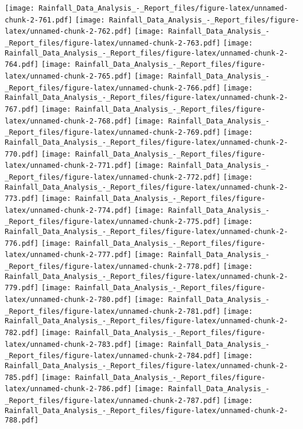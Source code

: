 \documentclass[
]{article}
\begin{document}
\texttt{[image: Rainfall\_Data\_Analysis\_-\_Report\_files/figure-latex/unnamed-chunk-2-761.pdf]}
\texttt{[image: Rainfall\_Data\_Analysis\_-\_Report\_files/figure-latex/unnamed-chunk-2-762.pdf]}
\texttt{[image: Rainfall\_Data\_Analysis\_-\_Report\_files/figure-latex/unnamed-chunk-2-763.pdf]}
\texttt{[image: Rainfall\_Data\_Analysis\_-\_Report\_files/figure-latex/unnamed-chunk-2-764.pdf]}
\texttt{[image: Rainfall\_Data\_Analysis\_-\_Report\_files/figure-latex/unnamed-chunk-2-765.pdf]}
\texttt{[image: Rainfall\_Data\_Analysis\_-\_Report\_files/figure-latex/unnamed-chunk-2-766.pdf]}
\texttt{[image: Rainfall\_Data\_Analysis\_-\_Report\_files/figure-latex/unnamed-chunk-2-767.pdf]}
\texttt{[image: Rainfall\_Data\_Analysis\_-\_Report\_files/figure-latex/unnamed-chunk-2-768.pdf]}
\texttt{[image: Rainfall\_Data\_Analysis\_-\_Report\_files/figure-latex/unnamed-chunk-2-769.pdf]}
\texttt{[image: Rainfall\_Data\_Analysis\_-\_Report\_files/figure-latex/unnamed-chunk-2-770.pdf]}
\texttt{[image: Rainfall\_Data\_Analysis\_-\_Report\_files/figure-latex/unnamed-chunk-2-771.pdf]}
\texttt{[image: Rainfall\_Data\_Analysis\_-\_Report\_files/figure-latex/unnamed-chunk-2-772.pdf]}
\texttt{[image: Rainfall\_Data\_Analysis\_-\_Report\_files/figure-latex/unnamed-chunk-2-773.pdf]}
\texttt{[image: Rainfall\_Data\_Analysis\_-\_Report\_files/figure-latex/unnamed-chunk-2-774.pdf]}
\texttt{[image: Rainfall\_Data\_Analysis\_-\_Report\_files/figure-latex/unnamed-chunk-2-775.pdf]}
\texttt{[image: Rainfall\_Data\_Analysis\_-\_Report\_files/figure-latex/unnamed-chunk-2-776.pdf]}
\texttt{[image: Rainfall\_Data\_Analysis\_-\_Report\_files/figure-latex/unnamed-chunk-2-777.pdf]}
\texttt{[image: Rainfall\_Data\_Analysis\_-\_Report\_files/figure-latex/unnamed-chunk-2-778.pdf]}
\texttt{[image: Rainfall\_Data\_Analysis\_-\_Report\_files/figure-latex/unnamed-chunk-2-779.pdf]}
\texttt{[image: Rainfall\_Data\_Analysis\_-\_Report\_files/figure-latex/unnamed-chunk-2-780.pdf]}
\texttt{[image: Rainfall\_Data\_Analysis\_-\_Report\_files/figure-latex/unnamed-chunk-2-781.pdf]}
\texttt{[image: Rainfall\_Data\_Analysis\_-\_Report\_files/figure-latex/unnamed-chunk-2-782.pdf]}
\texttt{[image: Rainfall\_Data\_Analysis\_-\_Report\_files/figure-latex/unnamed-chunk-2-783.pdf]}
\texttt{[image: Rainfall\_Data\_Analysis\_-\_Report\_files/figure-latex/unnamed-chunk-2-784.pdf]}
\texttt{[image: Rainfall\_Data\_Analysis\_-\_Report\_files/figure-latex/unnamed-chunk-2-785.pdf]}
\texttt{[image: Rainfall\_Data\_Analysis\_-\_Report\_files/figure-latex/unnamed-chunk-2-786.pdf]}
\texttt{[image: Rainfall\_Data\_Analysis\_-\_Report\_files/figure-latex/unnamed-chunk-2-787.pdf]}
\texttt{[image: Rainfall\_Data\_Analysis\_-\_Report\_files/figure-latex/unnamed-chunk-2-788.pdf]}
\end{document}
